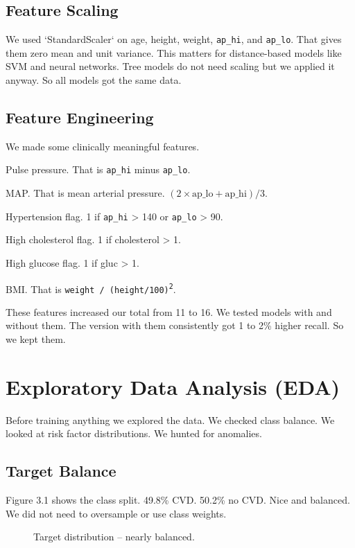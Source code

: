 \documentclass[12pt, a4paper, oneside]{book}
\begin{document}
\subsection{Feature Scaling}
We used `StandardScaler` on age, height, weight, \texttt{ap\_hi}, and \texttt{ap\_lo}. That gives them zero mean and unit variance. This matters for distance-based models like SVM and neural networks. Tree models do not need scaling but we applied it anyway. So all models got the same data.

\subsection{Feature Engineering}
We made some clinically meaningful features.

Pulse pressure. That is \texttt{ap\_hi} minus \texttt{ap\_lo}.

MAP. That is mean arterial pressure. $(2 \times \mathrm{ap\_lo} + \mathrm{ap\_hi}) / 3$.

Hypertension flag. 1 if \texttt{ap\_hi} > 140 or \texttt{ap\_lo} > 90.

High cholesterol flag. 1 if cholesterol > 1.

High glucose flag. 1 if gluc > 1.

BMI. That is \texttt{weight / (height/100)\textsuperscript{2}}.\par

These features increased our total from 11 to 16. We tested models with and without them. The version with them consistently got 1 to 2\% higher recall. So we kept them.

\section{Exploratory Data Analysis (EDA)}
Before training anything we explored the data. We checked class balance. We looked at risk factor distributions. We hunted for anomalies.

\subsection{Target Balance}
Figure 3.1 shows the class split. 49.8\% CVD. 50.2\% no CVD. Nice and balanced. We did not need to oversample or use class weights.

\begin{figure}[H]
\centering
{}
\caption{Target distribution – nearly balanced.}
\label{fig:target_pie}
\end{figure}
\end{document}
